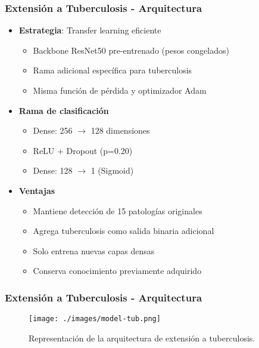 \begin{frame}
\frametitle{Extensión a Tuberculosis - Arquitectura}
\begin{itemize}
    \item \textbf{Estrategia}: Transfer learning eficiente
    \begin{itemize}
        \item Backbone ResNet50 pre-entrenado (pesos congelados)
        \item Rama adicional específica para tuberculosis
        \item Misma función de pérdida y optimizador Adam
    \end{itemize}
    \item \textbf{Rama de clasificación}
    \begin{itemize}
        \item Dense: 256 $\rightarrow$ 128 dimensiones
        \item ReLU + Dropout (p=0.20)
        \item Dense: 128 $\rightarrow$ 1 (Sigmoid)
    \end{itemize}
    \item \textbf{Ventajas}
    \begin{itemize}
        \item Mantiene detección de 15 patologías originales
        \item Agrega tuberculosis como salida binaria adicional
        \item Solo entrena nuevas capas densas
        \item Conserva conocimiento previamente adquirido
    \end{itemize}
\end{itemize}
\end{frame}

\begin{frame}
\frametitle{Extensión a Tuberculosis - Arquitectura}
\begin{figure}[ht!]
    \centering
    \texttt{[image: ./images/model-tub.png]}
    \caption{Representación de la arquitectura de extensión a tuberculosis.}
\end{figure}
\end{frame}


